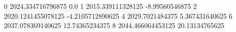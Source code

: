 0 2024.334716796875 0.0
1 2015.339111328125 -8.99560546875
2 2020.1241455078125 -4.2105712890625
4 2029.7021484375 5.367431640625
6 2037.078369140625 12.74365234375
8 2044.466064453125 20.13134765625
